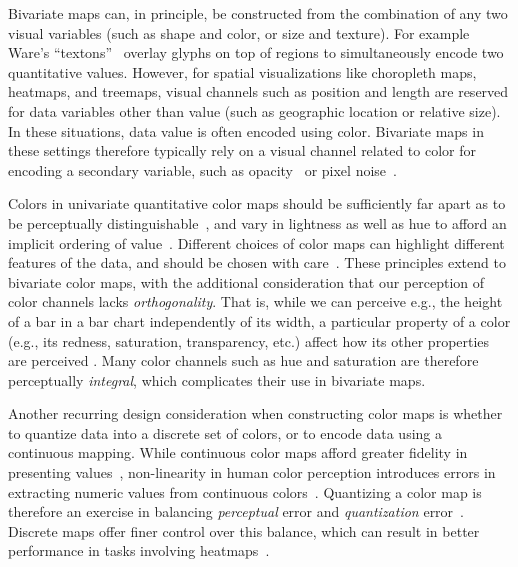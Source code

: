 Bivariate maps can, in principle, be constructed from the combination of any two visual variables (such as shape and color, or size and texture). For example Ware's ``textons''~\cite{ware2009quantitative} overlay glyphs on top of regions to simultaneously encode two quantitative values. However, for spatial visualizations like choropleth maps, heatmaps, and treemaps, visual channels such as position and length are reserved for data variables other than value (such as geographic location or relative size). In these situations, data value is often encoded using color. Bivariate maps in these settings therefore typically rely on a visual channel related to color for encoding a secondary variable, such as opacity~\cite{roth2010value} or pixel noise~\cite{lucchesi2017visualizing}.

Colors in univariate quantitative color maps should be sufficiently far apart as to be perceptually distinguishable~\cite{ware1988color}, and vary in lightness as well as hue to afford an implicit ordering of value~\cite{borland2007rainbow,rogowitz2001blair}. Different choices of color maps can highlight different features of the data, and should be chosen with care~\cite{rogowitz1996not}. These principles extend to bivariate color maps, with the additional consideration that our perception of color channels lacks \emph{orthogonality}. That is, while we can perceive e.g., the height of a bar in a bar chart independently of its width, a particular property of a color (e.g., its redness, saturation, transparency, etc.) affect how its other properties are perceived \cite{garner1970integrality,ware2012information}. Many color channels such as hue and saturation are therefore perceptually \emph{integral}, which complicates their use in bivariate maps.

Another recurring design consideration when constructing color maps is whether to quantize data into a discrete set of colors, or to encode data using a continuous mapping. While continuous color maps afford greater fidelity in presenting values~\cite{muller1979perception}, non-linearity in human color perception introduces errors in extracting numeric values from continuous colors~\cite{borland2007rainbow}. Quantizing a color map is therefore an exercise in balancing \emph{perceptual} error and \emph{quantization} error~\cite{dobson1973choropleth}. Discrete maps offer finer control over this balance, which can result in better performance in tasks involving heatmaps~\cite{padilla2017evaluating}.

